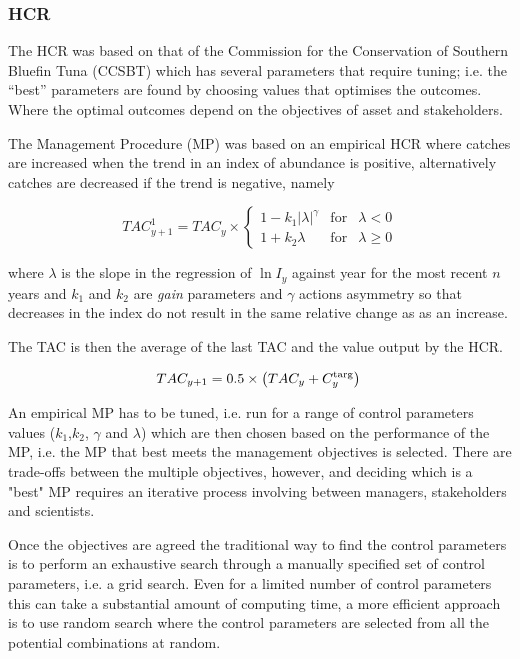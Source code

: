 \documentclass[12pt,doublespacing,a4paper]{ouparticle}
\begin{document}
\subsubsection{HCR}

The HCR was based on that of the Commission for the Conservation of Southern Bluefin Tuna (CCSBT) which has several parameters that require tuning; i.e. the “best” parameters are found by choosing  values that optimises the outcomes. Where the optimal outcomes depend on the objectives of  asset and stakeholders. 

The Management Procedure (MP) was based on an empirical HCR where catches are increased when the trend in an index of abundance is positive, alternatively catches are decreased if the trend is negative, namely 

\begin{equation}
 TAC^1_{y+1}=TAC_y\times 
 \left\{\begin{array}{rcl}  
    {1-k_1|\lambda|^{\gamma}} & \mbox{for} & \lambda<0\\[0.35cm]
    {1+k_2\lambda} & \mbox{for} & \lambda\geq 0 
 \end{array}\right.
\end{equation}

where $\lambda$ is the slope in the regression of $\ln I_y$ against year for the most recent $n$ years and $k_1$ and $k_2$ are \textit{gain} parameters and $\gamma$ actions asymmetry so that decreases in the index do not result in the same relative change as as an increase.

The TAC is then the average of the last TAC and the value output by the HCR. 

\begin{equation} 
     TAC_{y+1} = 0.5\times\left(TAC_y+C^{\rm targ}_y\right)\\
\end{equation}

An empirical MP has to be tuned, i.e. run for a range of control parameters values ($k_1$,$k_2$, $\gamma$ and $\lambda$) which are then chosen based on the performance of the MP, i.e. the MP that best meets the management objectives is selected. There are trade-offs between the multiple objectives, however, and  deciding which is a "best" MP requires an iterative process involving between managers, stakeholders and scientists.  

Once the objectives are agreed the traditional way to find the control parameters is to perform an exhaustive search through a manually specified set of control parameters, i.e. a grid search. Even for a limited number of control parameters this can take a substantial amount of computing time, a more efficient approach is to use random search where the control parameters are selected from all the potential combinations at random.
\end{document}
